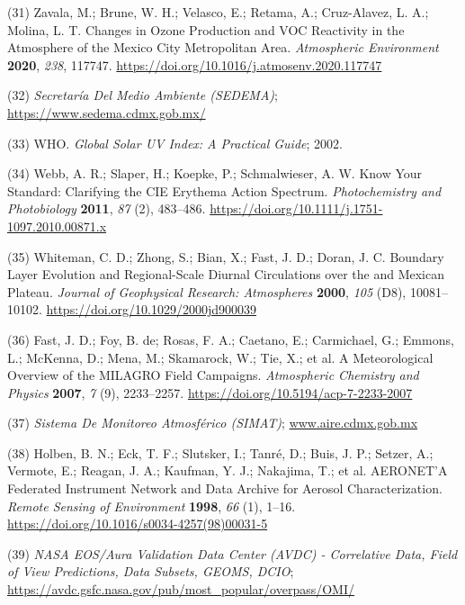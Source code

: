 \documentclass[10pt]{article}
\begin{document}
\label{csl:31}(31) Zavala, M.; Brune, W. H.; Velasco, E.; Retama, A.; Cruz-Alavez, L. A.; Molina, L. T. {Changes in Ozone Production and {VOC} Reactivity in the Atmosphere of the Mexico City Metropolitan Area}. \textit{Atmospheric Environment} \textbf{2020}, \textit{238}, 117747. \url{https://doi.org/10.1016/j.atmosenv.2020.117747}

\label{csl:32}(32) \textit{{Secretaría Del Medio Ambiente (SEDEMA)}}; \url{https://www.sedema.cdmx.gob.mx/}

\label{csl:33}(33) WHO. \textit{{Global Solar UV Index: A Practical Guide}}; 2002.

\label{csl:34}(34) Webb, A. R.; Slaper, H.; Koepke, P.; Schmalwieser, A. W. {Know Your Standard: Clarifying the {CIE} Erythema Action Spectrum}. \textit{Photochemistry and Photobiology} \textbf{2011}, \textit{87} (2), 483–486. \url{https://doi.org/10.1111/j.1751-1097.2010.00871.x}

\label{csl:35}(35) Whiteman, C. D.; Zhong, S.; Bian, X.; Fast, J. D.; Doran, J. C. {Boundary Layer Evolution and Regional-Scale Diurnal Circulations over the and Mexican Plateau}. \textit{Journal of Geophysical Research: Atmospheres} \textbf{2000}, \textit{105} (D8), 10081–10102. \url{https://doi.org/10.1029/2000jd900039}

\label{csl:36}(36) Fast, J. D.; Foy, B. de; Rosas, F. A.; Caetano, E.; Carmichael, G.; Emmons, L.; McKenna, D.; Mena, M.; Skamarock, W.; Tie, X.; et al. {A Meteorological Overview of the {MILAGRO} Field Campaigns}. \textit{Atmospheric Chemistry and Physics} \textbf{2007}, \textit{7} (9), 2233–2257. \url{https://doi.org/10.5194/acp-7-2233-2007}

\label{csl:37}(37) \textit{{Sistema De Monitoreo Atmosférico (SIMAT)}}; \url{www.aire.cdmx.gob.mx}

\label{csl:38}(38) Holben, B. N.; Eck, T. F.; Slutsker, I.; Tanr{\'{e}}, D.; Buis, J. P.; Setzer, A.; Vermote, E.; Reagan, J. A.; Kaufman, Y. J.; Nakajima, T.; et al. {{AERONET}'A Federated Instrument Network and Data Archive for Aerosol Characterization}. \textit{Remote Sensing of Environment} \textbf{1998}, \textit{66} (1), 1–16. \url{https://doi.org/10.1016/s0034-4257(98)00031-5}

\label{csl:39}(39) \textit{{NASA EOS/Aura Validation Data Center (AVDC) - Correlative Data, Field of View Predictions, Data Subsets, GEOMS, DCIO}}; \url{https://avdc.gsfc.nasa.gov/pub/most_popular/overpass/OMI/}
\end{document}
